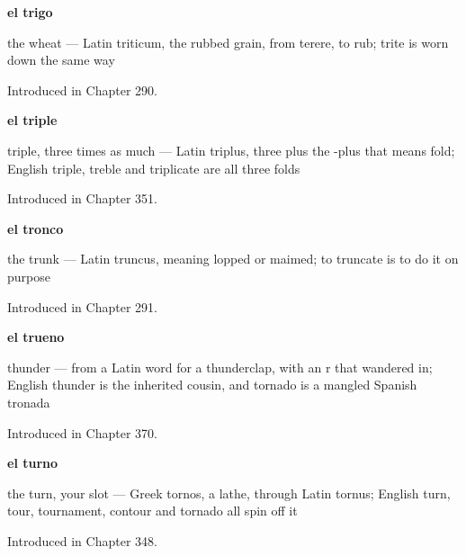 \noindent\begin{minipage}[t]{\linewidth}
\raggedright
\textbf{el trigo}\par
\small the wheat — Latin triticum, the rubbed grain, from terere, to rub; trite is worn down the same way\par
\footnotesize Introduced in Chapter 290.
\end{minipage}\par\medskip

\noindent\begin{minipage}[t]{\linewidth}
\raggedright
\textbf{el triple}\par
\small triple, three times as much — Latin triplus, three plus the -plus that means fold; English triple, treble and triplicate are all three folds\par
\footnotesize Introduced in Chapter 351.
\end{minipage}\par\medskip

\noindent\begin{minipage}[t]{\linewidth}
\raggedright
\textbf{el tronco}\par
\small the trunk — Latin truncus, meaning lopped or maimed; to truncate is to do it on purpose\par
\footnotesize Introduced in Chapter 291.
\end{minipage}\par\medskip

\noindent\begin{minipage}[t]{\linewidth}
\raggedright
\textbf{el trueno}\par
\small thunder — from a Latin word for a thunderclap, with an r that wandered in; English thunder is the inherited cousin, and tornado is a mangled Spanish tronada\par
\footnotesize Introduced in Chapter 370.
\end{minipage}\par\medskip

\noindent\begin{minipage}[t]{\linewidth}
\raggedright
\textbf{el turno}\par
\small the turn, your slot — Greek tornos, a lathe, through Latin tornus; English turn, tour, tournament, contour and tornado all spin off it\par
\footnotesize Introduced in Chapter 348.
\end{minipage}\par\medskip

